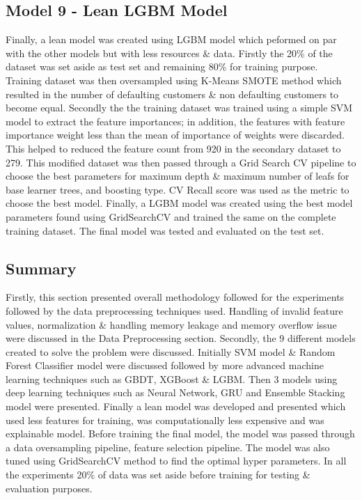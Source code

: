 \documentclass[twoside,11pt,a4paper]{article}
\begin{document}
\subsection{Model 9 - Lean \acs{LGBM} Model}
Finally, a lean model was created using \acs{LGBM} model which peformed on par with the other models but with less resources \& data. Firstly the 20\% of the dataset was set aside as test set and remaining 80\% for training purpose. Training dataset was then oversampled using K-Means \acs{SMOTE} method which resulted in the number of defaulting customers \& non defaulting customers to become equal. Secondly the the training dataset was trained using a simple \acs{SVM} model to extract the feature importances; in addition, the features with feature importance weight less than the mean of importance of weights were discarded. This helped to reduced the feature count from 920 in the secondary dataset to 279. This modified dataset was then passed through a Grid Search CV pipeline to choose the best parameters for maximum depth \& maximum number of leafs for base learner trees, and boosting type. \acf{CV} Recall score was used as the metric to choose the best model. Finally, a \acs{LGBM} model was created using the best model parameters found using GridSearchCV and trained the same on the complete training dataset. The final model was tested and evaluated on the test set.

\subsection{Summary}
Firstly, this section presented overall methodology followed for the experiments followed by the data preprocessing techniques used. Handling of invalid feature values, normalization \& handling memory leakage and memory overflow issue were discussed in the Data Preprocessing section. Secondly, the 9 different models created to solve the problem were discussed. Initially \acs{SVM} model \& Random Forest Classifier model were discussed followed by more advanced machine learning techniques such as \acs{GBDT}, \acs{XGBoost} \& \acs{LGBM}. Then 3 models using deep learning techniques such as Neural Network, \acs{GRU}  and Ensemble Stacking model were presented. Finally a lean model was developed and presented which used less features for training, was computationally less expensive and was explainable model. Before training the final model, the model was passed through a data oversampling pipeline, feature selection pipeline. The model was also tuned using GridSearchCV method to find the optimal hyper parameters. In all the experiments 20\% of data was set aside before training for testing \& evaluation purposes.
\vfill
\clearpage
\end{document}
